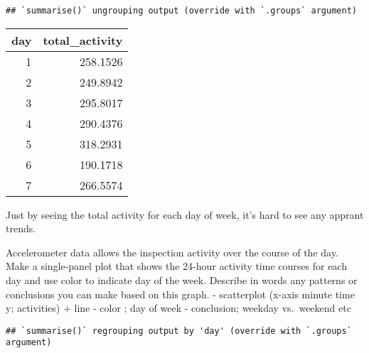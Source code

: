 \documentclass[]{article}
\newenvironment{Shaded}{\begin{snugshade}}{\end{snugshade}}
\newcommand{\DataTypeTok}[1]{\textcolor[rgb]{0.13,0.29,0.53}{#1}}
\newcommand{\KeywordTok}[1]{\textcolor[rgb]{0.13,0.29,0.53}{\textbf{#1}}}
\newcommand{\NormalTok}[1]{#1}
\newcommand{\OperatorTok}[1]{\textcolor[rgb]{0.81,0.36,0.00}{\textbf{#1}}}
\newcommand{\StringTok}[1]{\textcolor[rgb]{0.31,0.60,0.02}{#1}}
\begin{document}
\begin{Shaded}
\end{Shaded}

\begin{verbatim}
## `summarise()` ungrouping output (override with `.groups` argument)
\end{verbatim}

\begin{longtable}[]{@{}rr@{}}
\toprule
day & total\_activity\tabularnewline
\midrule
\endhead
1 & 258.1526\tabularnewline
2 & 249.8942\tabularnewline
3 & 295.8017\tabularnewline
4 & 290.4376\tabularnewline
5 & 318.2931\tabularnewline
6 & 190.1718\tabularnewline
7 & 266.5574\tabularnewline
\bottomrule
\end{longtable}

Just by seeing the total activity for each day of week, it's hard to see
any apprant trends.

Accelerometer data allows the inspection activity over the course of the
day. Make a single-panel plot that shows the 24-hour activity time
courses for each day and use color to indicate day of the week. Describe
in words any patterns or conclusions you can make based on this graph. -
scatterplot (x-axis minute time y; activities) + line - color ; day of
week - conclusion; weekday vs.~weekend etc

\begin{Shaded}
\end{Shaded}

\begin{verbatim}
## `summarise()` regrouping output by 'day' (override with `.groups` argument)
\end{verbatim}
\end{document}
